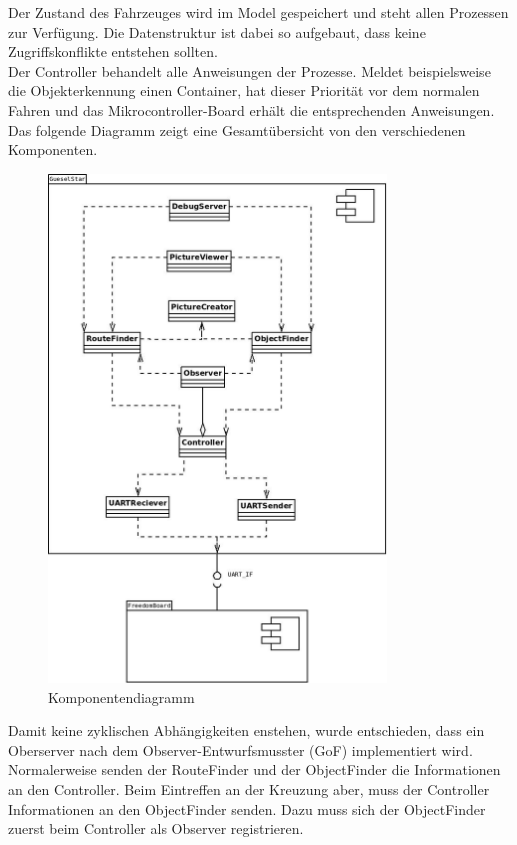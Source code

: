 Der Zustand des Fahrzeuges wird im Model gespeichert und steht allen Prozessen zur Verfügung. Die Datenstruktur ist dabei so aufgebaut, dass keine Zugriffskonflikte entstehen sollten.\\
Der Controller behandelt alle Anweisungen der Prozesse. Meldet beispielsweise die Objekterkennung einen Container, hat dieser Priorität vor dem normalen Fahren und das Mikrocontroller-Board erhält die entsprechenden Anweisungen. Das folgende Diagramm zeigt eine Gesamtübersicht von den verschiedenen Komponenten.\\[0.2cm]
\begin{figure}[H]
\centering
\includegraphics[width=0.8\textwidth]{03_Loesungskonzept/pictures/Komponentendiagramm_detailliert_v2.jpeg}
\caption{Komponentendiagramm}
\end{figure}
Damit keine zyklischen Abhängigkeiten enstehen, wurde entschieden, dass ein Oberserver nach dem Observer-Entwurfsmusster (GoF) implementiert wird. Normalerweise senden der RouteFinder und der ObjectFinder die Informationen an den Controller. Beim Eintreffen an der Kreuzung aber, muss der Controller Informationen an den ObjectFinder senden. Dazu muss sich der ObjectFinder zuerst beim Controller als Observer registrieren.

